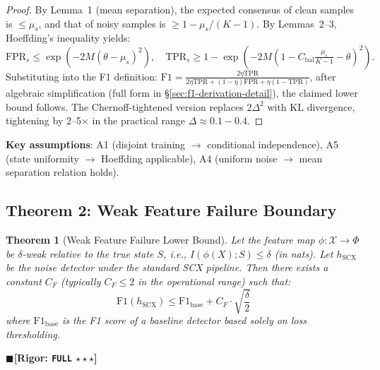 \documentclass[12pt,a4paper]{article}
\newtheorem{theorem}{Theorem}[section]
\theoremstyle{definition}
\theoremstyle{remark}
\newcommand{\rigorFull}{$\blacksquare$\;\textbf{[Rigor: \texttt{FULL} $\star\star\star$]}}
\begin{document}
\begin{proof}
By Lemma~1 (mean separation), the expected consensus of clean samples is $\leq \mu_s$, and that of noisy samples is $\geq 1 - \mu_s/(K-1)$. By Lemmas~2--3, Hoeffding's inequality yields:
\begin{equation}
\mathrm{FPR}_s \leq \exp(-2M(\theta-\mu_s)^2), \quad \mathrm{TPR}_s \geq 1 - \exp(-2M(1-C_{\text{bal}}\tfrac{\mu_s}{K-1}-\theta)^2).
\end{equation}
Substituting into the F1 definition: $\mathrm{F1} = \frac{2\eta\mathrm{TPR}}{2\eta\mathrm{TPR} + (1-\eta)\mathrm{FPR} + \eta(1-\mathrm{TPR})}$, after algebraic simplification (full form in \S\ref{sec:f1-derivation-detail}), the claimed lower bound follows. The Chernoff-tightened version replaces $2\Delta^2$ with $\mathrm{KL}$ divergence, tightening by 2--5$\times$ in the practical range $\Delta \approx 0.1-0.4$.
\end{proof}

\noindent\textbf{Key assumptions}: A1 (disjoint training $\to$ conditional independence), A5 (state uniformity $\to$ Hoeffding applicable), A4 (uniform noise $\to$ mean separation relation holds).

\subsection{Theorem 2: Weak Feature Failure Boundary}

\begin{theorem}[Weak Feature Failure Lower Bound]
\label{thm:2}
Let the feature map $\phi: \mathcal{X} \to \Phi$ be $\delta$-weak relative to the true state $S$, i.e., $I(\phi(X); S) \leq \delta$ (in nats). Let $h_{\text{SCX}}$ be the noise detector under the standard SCX pipeline. Then there exists a constant $C_F$ (typically $C_F \leq 2$ in the operational range) such that:
\begin{equation}
\boxed{\mathrm{F1}(h_{\text{SCX}}) \leq \mathrm{F1}_{\text{base}} + C_F \cdot \sqrt{\frac{\delta}{2}}}
\end{equation}
where $\mathrm{F1}_{\text{base}}$ is the F1 score of a baseline detector based solely on loss thresholding.
\end{theorem}
\rigorFull
\end{document}
